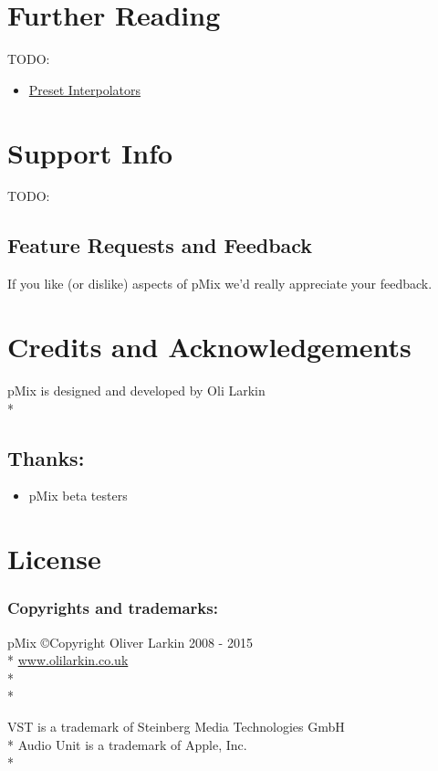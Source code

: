 \documentclass[a4paper,14pt]{report}
\begin{document}
\chapter{Further Reading} \label{chap:furtherreading}

TODO: 

\begin{itemize}
\item \href{http://www.olilarkin.co.uk}{Preset Interpolators}
\end{itemize}

\chapter{Support Info}
TODO: 


\section*{Feature Requests and Feedback}
If you like (or dislike) aspects of pMix we'd really appreciate your feedback. 

\chapter{Credits and Acknowledgements}
pMix is designed and developed by Oli Larkin \\* 
\section*{Thanks:}
\begin{itemize}
\item pMix beta testers
\end{itemize}

\printglossaries

\chapter{License}

\subsection*{Copyrights and trademarks:}
pMix \copyright Copyright Oliver Larkin 2008 - 2015\\*
\href{www.olilarkin.co.uk}{www.olilarkin.co.uk}\\*\\*

VST is a trademark of Steinberg Media Technologies GmbH\\*
Audio Unit is a trademark of Apple, Inc.\\*
\end{document}
